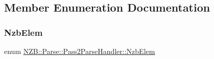 \subsection{Member Enumeration Documentation}
\hypertarget{class_n_z_b_1_1_parse_1_1_pass2_parse_handler_a05e6d45260e206949b805d1f8bb24cc5}{}\label{class_n_z_b_1_1_parse_1_1_pass2_parse_handler_a05e6d45260e206949b805d1f8bb24cc5} 
\subsubsection{\texorpdfstring{Nzb\+Elem}{NzbElem}}
{\footnotesize\ttfamily enum \hyperlink{class_n_z_b_1_1_parse_1_1_pass2_parse_handler_a05e6d45260e206949b805d1f8bb24cc5}{N\+Z\+B\+::\+Parse\+::\+Pass2\+Parse\+Handler\+::\+Nzb\+Elem}\hspace{0.3cm}{\ttfamily [protected]}}

